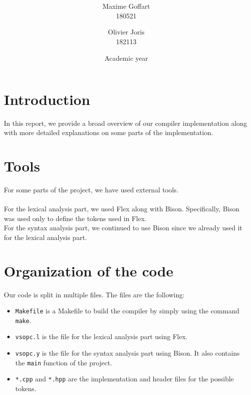 \documentclass[a4paper, 11pt, oneside]{article}
\title{\ClassName\\\vspace*{0.8cm}\ProjectName\vspace{1cm}}
\author{Maxime Goffart \\180521 \and Olivier Joris\\182113}
\date{\vspace{1cm}Academic year \AcademicYear}
\begin{document}

\begin{titlingpage}
{\let\newpage\relax\maketitle}
\end{titlingpage}

\newpage


\section{Introduction}
\paragraph{}In this report, we provide a broad overview of our compiler implementation along with more detailed explanations on some parts of the implementation.


\section{Tools}
\paragraph{}For some parts of the project, we have used external tools.

\paragraph{}For the lexical analysis part, we used Flex along with Bison. Specifically, Bison was used only to define the tokens used in Flex.\\
For the syntax analysis part, we continued to use Bison since we already used it for the lexical analysis part.


\section{Organization of the code} \label{codeOrg}
\paragraph{}Our code is split in multiple files. The files are the following:
\begin{itemize}
	\item \texttt{Makefile} is a Makefile to build the compiler by simply using the command \texttt{make}.
	\item \texttt{vsopc.l} is the file for the lexical analysis part using Flex.
	\item \texttt{vsopc.y} is the file for the syntax analysis part using Bison. It also contains the \texttt{main} function of the project.
	\item \texttt{*.cpp} and \texttt{*.hpp} are the implementation and header files for the possible tokens.
\end{itemize}
\end{document}
